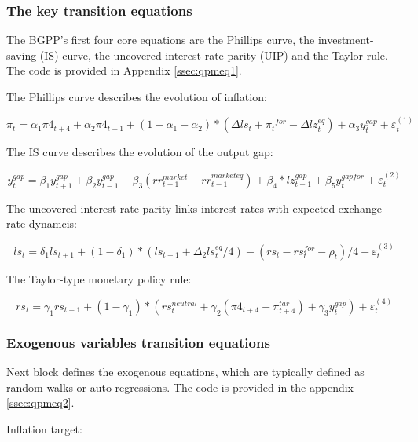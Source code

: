 \documentclass[12pt]{article}
\begin{document}
\subsubsection{The key transition equations}
The BGPP's first four core equations are the Phillips curve, the investment-saving (IS) curve, the uncovered interest rate parity (UIP)  and the Taylor rule. The code is provided in Appendix \ref{ssec:qpmeq1}. 

The Phillips curve describes the evolution of inflation:

\begin{equation}
	\pi_t = \alpha_1 {\pi}4_{t+4} + \alpha_2{\pi}4_{t-1} + (1-\alpha_1-\alpha_2)*(\Delta ls_t + \pi{_t}^{for}-\Delta lz_{t}^{eq}) + \alpha_3 y_{t}^{gap}+\varepsilon_{t}^{(1)}
\end{equation}

The IS curve describes the evolution of the output gap:

\begin{equation}
	y_{t}^{gap} = \beta_1 y_{t+1}^{gap} + \beta_2 y_{t-1}^{gap} - \beta_3(rr_{t-1}^{market} - rr_{t-1}^{market eq}) + \beta_4*lz_{t-1}^{gap}+\beta_5 y_t^{gap for}+\varepsilon_{t}^{(2)}
\end{equation}

The uncovered interest rate parity links interest rates with expected exchange rate dynamcis:

\begin{equation}
	ls_t = \delta_1 ls_{t+1} + (1-\delta_1)*(ls_{t-1} + \Delta_2ls_t^{eq}/4) - (rs_t-rs_t^{for} - \rho_t)/4 + \varepsilon_{t}^{(3)}
\end{equation}

The Taylor-type monetary policy rule:

\begin{equation}
	rs_t = \gamma_1 rs_{t-1} + (1-\gamma_1)*(rs_{t}^{neutral} + \gamma_2 (\pi4_{t+4}-\pi_{t+4}^{tar})+\gamma_3 y_t^{gap}) + \varepsilon_{t}^{(4)}
\end{equation}

\subsubsection{Exogenous variables transition equations}

Next block defines the exogenous equations, which are typically defined as random walks or auto-regressions. The code is provided in the appendix \ref{ssec:qpmeq2}. 

Inflation target: 
\end{document}
